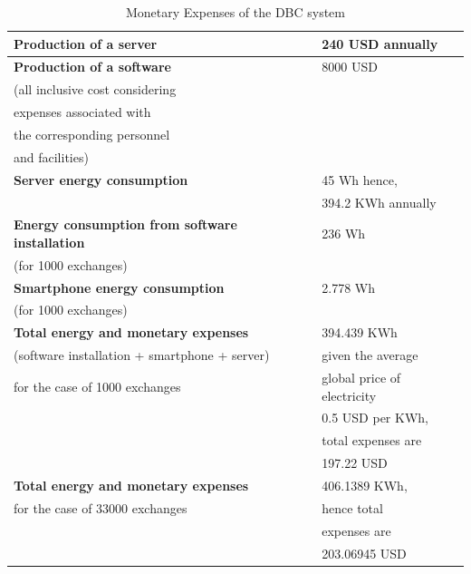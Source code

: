 \documentclass[conference]{IEEEtran}
\begin{document}
\begin{table}[htbp]
\caption{Monetary Expenses of the DBC system}
\begin{center}
\begin{tabular}{|l|l|}
\hline
\textbf{Production of a server} & 240 USD annually \\ \hline
\textbf{Production of a software} & 8000 USD \\ %
(all inclusive cost considering &  \\
expenses associated with &  \\ 
the corresponding personnel & \\
and facilities) & \\\hline
\textbf{Server energy consumption} & 45 Wh hence,\\ %
 & 394.2 KWh annually \\ \hline
\textbf{Energy consumption from software installation} & 236 Wh\\ (for 1000 exchanges) & \\ \hline
\textbf{Smartphone energy consumption} & 2.778 Wh \\ 
(for 1000 exchanges) & \\ \hline
\textbf{Total energy and monetary expenses} & 394.439 KWh\\
 (software installation + smartphone + server) & given the average \\
 for the case of 1000 exchanges & global price of electricity\\
 & 0.5 USD per KWh,\\
& total expenses are \\
& 197.22 USD \\
\hline

\textbf{Total energy and monetary expenses} & 406.1389 KWh,   \\ 
for the case of 33000 exchanges & hence total\\
& expenses are \\
& 203.06945 USD \\
 \hline
 

\end{tabular}
\end{center}
\label{PBCcalc}
\end{table}
\end{document}
